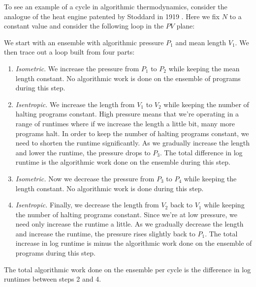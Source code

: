 \documentclass{article}
\begin{document}
To see an example of a cycle in algorithmic thermodynamics, consider
the analogue of the heat engine patented by Stoddard in 1919
\cite{Stoddard1919}.  Here we fix $N$ to a constant value and consider 
the following loop in the $PV$ plane:
\begin{center}
\end{center}
We start with an ensemble with algorithmic pressure $P_1$ and mean
length $V_1$.  We then trace out a loop built from four parts:

\begin{enumerate}
  \item 
  \emph{Isometric}. We increase the pressure from $P_1$ to $P_2$ while keeping
  the mean length constant.  No algorithmic work is done on the ensemble
  of programs during this step.
  \item
  \emph{Isentropic.} We increase the length from $V_1$ to $V_2$ while keeping
  the number of halting programs constant.  High pressure means 
  that we're operating in a range of runtimes where if we increase
  the length a little bit, many more programs halt.  In order
  to keep the number of halting programs constant,
  we need to shorten the runtime significantly.  As we gradually
  increase the length and lower the runtime, the pressure drops to $P_3$.
  The total difference in log runtime is the algorithmic 
  work done on the ensemble during this step.
  \item
  \emph{Isometric.} Now we decrease the pressure from $P_3$ to $P_4$ while
  keeping the length constant.  No algorithmic work is done during this step.
  \item
  \emph{Isentropic.} Finally, we decrease the length from $V_2$ back to $V_1$
  while keeping the number of halting programs constant.
  Since we're at low pressure, we need only increase the
  runtime a little.  As we gradually decrease the length
  and increase the runtime, the pressure rises slightly
  back to $P_1$.  The total increase in log runtime is minus the algorithmic
  work done on the ensemble of programs during this step.
\end{enumerate}
The total algorithmic work done on the ensemble per cycle is the 
difference in log runtimes between steps 2 and 4.
\end{document}
